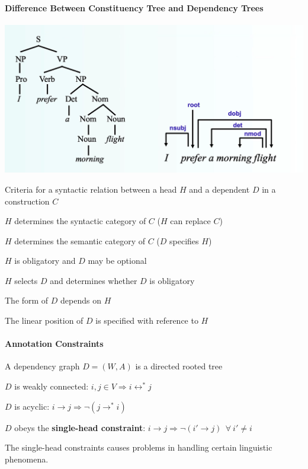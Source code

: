 \documentclass[10pt]{report}
\begin{document}
\paragraph{Difference Between Constituency Tree and Dependency Trees}
\begin{center}
	\includegraphics[scale=0.5]{37.png}
\end{center}
Criteria for a syntactic relation between a head $H$ and a dependent $D$ in a construction $C$
\begin{list}{}{}
	\item $H$ determines the syntactic category of $C$ ($H$ can replace $C$)
	\item $H$ determines the semantic category of $C$ ($D$ specifies $H$)
	\item $H$ is obligatory and $D$ may be optional
	\item $H$ selects $D$ and determines whether $D$ is obligatory
	\item The form of $D$ depends on $H$
	\item The linear position of $D$ is specified with reference to $H$
\end{list}
\paragraph{Annotation Constraints} A dependency graph $D = (W, A)$ is a directed rooted tree
\begin{list}{}{}
	\item $D$ is weakly connected: $i,j\in V\Rightarrow i\leftrightarrow^* j$
	\item $D$ is acyclic: $i\rightarrow j \Rightarrow \neg(j\rightarrow^* i)$
	\item $D$ obeys the \textbf{single-head constraint}: $i\rightarrow j \Rightarrow \neg(i'\rightarrow j)\:\:\forall\:i'\neq i$
\end{list}
The single-head constraints causes problems in handling certain linguistic phenomena.
\end{document}
